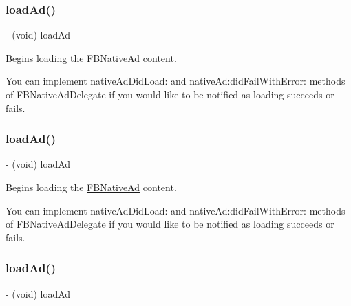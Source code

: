 \subsubsection{\texorpdfstring{load\+Ad()}{loadAd()}\hspace{0.1cm}{\footnotesize\ttfamily [2/5]}}
{\footnotesize\ttfamily -\/ (void) load\+Ad \begin{DoxyParamCaption}{ }\end{DoxyParamCaption}}

Begins loading the \hyperlink{interfaceFBNativeAd}{F\+B\+Native\+Ad} content.

You can implement {\ttfamily native\+Ad\+Did\+Load\+:} and {\ttfamily native\+Ad\+:did\+Fail\+With\+Error\+:} methods of {\ttfamily F\+B\+Native\+Ad\+Delegate} if you would like to be notified as loading succeeds or fails. \mbox{\label{interfaceFBNativeAd_a943433e6b6c4e4a3d3868203642cda15}} 
\subsubsection{\texorpdfstring{load\+Ad()}{loadAd()}\hspace{0.1cm}{\footnotesize\ttfamily [3/5]}}
{\footnotesize\ttfamily -\/ (void) load\+Ad \begin{DoxyParamCaption}{ }\end{DoxyParamCaption}}

Begins loading the \hyperlink{interfaceFBNativeAd}{F\+B\+Native\+Ad} content.

You can implement {\ttfamily native\+Ad\+Did\+Load\+:} and {\ttfamily native\+Ad\+:did\+Fail\+With\+Error\+:} methods of {\ttfamily F\+B\+Native\+Ad\+Delegate} if you would like to be notified as loading succeeds or fails. \mbox{\label{interfaceFBNativeAd_a943433e6b6c4e4a3d3868203642cda15}} 
\subsubsection{\texorpdfstring{load\+Ad()}{loadAd()}\hspace{0.1cm}{\footnotesize\ttfamily [4/5]}}
{\footnotesize\ttfamily -\/ (void) load\+Ad \begin{DoxyParamCaption}{ }\end{DoxyParamCaption}}

